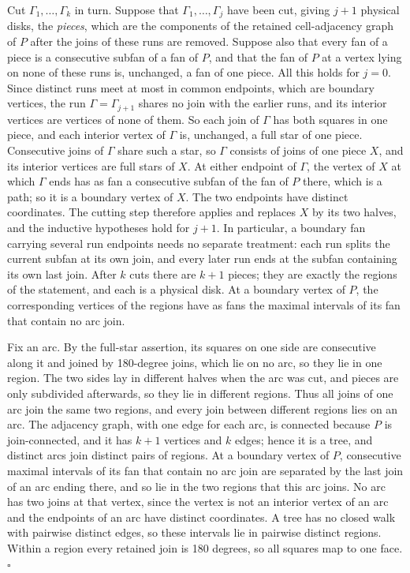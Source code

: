 \documentclass[
  11pt,
]{article}
\newcounter{none} %
\begin{document}
Cut \(\Gamma_1,\ldots,\Gamma_k\) in turn. Suppose that
\(\Gamma_1,\ldots,\Gamma_j\) have been cut, giving \(j+1\) physical
disks, the \emph{pieces}, which are the components of the retained
cell-adjacency graph of \(P\) after the joins of these runs are removed.
Suppose also that every fan of a piece is a consecutive subfan of a fan
of \(P\), and that the fan of \(P\) at a vertex lying on none of these
runs is, unchanged, a fan of one piece. All this holds for \(j=0\).
Since distinct runs meet at most in common endpoints, which are boundary
vertices, the run \(\Gamma=\Gamma_{j+1}\) shares no join with the
earlier runs, and its interior vertices are vertices of none of them. So
each join of \(\Gamma\) has both squares in one piece, and each interior
vertex of \(\Gamma\) is, unchanged, a full star of one piece.
Consecutive joins of \(\Gamma\) share such a star, so \(\Gamma\)
consists of joins of one piece \(X\), and its interior vertices are full
stars of \(X\). At either endpoint of \(\Gamma\), the vertex of \(X\) at
which \(\Gamma\) ends has as fan a consecutive subfan of the fan of
\(P\) there, which is a path; so it is a boundary vertex of \(X\). The
two endpoints have distinct coordinates. The cutting step therefore
applies and replaces \(X\) by its two halves, and the inductive
hypotheses hold for \(j+1\). In particular, a boundary fan carrying
several run endpoints needs no separate treatment: each run splits the
current subfan at its own join, and every later run ends at the subfan
containing its own last join. After \(k\) cuts there are \(k+1\) pieces;
they are exactly the regions of the statement, and each is a physical
disk. At a boundary vertex of \(P\), the corresponding vertices of the
regions have as fans the maximal intervals of its fan that contain no
arc join.

Fix an arc. By the full-star assertion, its squares on one side are
consecutive along it and joined by 180-degree joins, which lie on no
arc, so they lie in one region. The two sides lay in different halves
when the arc was cut, and pieces are only subdivided afterwards, so they
lie in different regions. Thus all joins of one arc join the same two
regions, and every join between different regions lies on an arc. The
adjacency graph, with one edge for each arc, is connected because \(P\)
is join-connected, and it has \(k+1\) vertices and \(k\) edges; hence it
is a tree, and distinct arcs join distinct pairs of regions. At a
boundary vertex of \(P\), consecutive maximal intervals of its fan that
contain no arc join are separated by the last join of an arc ending
there, and so lie in the two regions that this arc joins. No arc has two
joins at that vertex, since the vertex is not an interior vertex of an
arc and the endpoints of an arc have distinct coordinates. A tree has no
closed walk with pairwise distinct edges, so these intervals lie in
pairwise distinct regions. Within a region every retained join is 180
degrees, so all squares map to one face. \(\square\)
\end{document}

